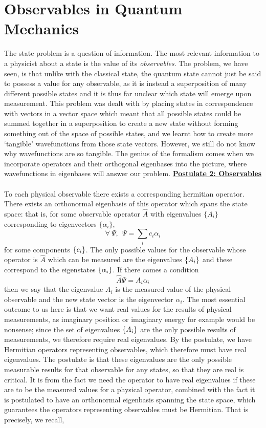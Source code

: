\section{Observables in Quantum Mechanics}
The state problem is a question of information. The most relevant information to a physicist about a state is the value of its \textit{observables}. The problem, we have seen, is that unlike with the classical state, the quantum state cannot just be said to possess a value for any observable, as it is instead a superposition of many different possible states and it is thus far unclear which state will emerge upon measurement. This problem was dealt with by placing states in correspondence with vectors in a vector space which meant that all possible states could be summed together in a superposition to create a new state without forming something out of the space of possible states, and we learnt how to create more `tangible' wavefunctions from those state vectors. However, we still do not know why wavefunctions are so tangible. The genius of the formalism comes when we incorporate operators and their orthogonal eigenbases into the picture, where wavefunctions in eigenbases will answer our problem.
\Answer
\underline{\textbf{Postulate 2: Observables}}\\\\
To each physical observable there exists a corresponding hermitian operator. There exists an orthonormal eigenbasis of this operator which spans the state space: that is, for some observable operator $\hat{A}$ with eigenvalues $\{A_{i}\}$ corresponding to eigenvectors $\{\alpha_{i}\}$,
$$
\forall\:\Psi, \:\: \Psi=\sum_{i}c_{i}\alpha_{i}
$$
for some components $\{c_{i}\}$. The only possible values for the observable whose operator is $\hat{A}$ which can be measured are the eigenvalues $\{A_{i}\}$ and these correspond to the eigenstates $\{\alpha_{i}\}$. If there comes a condition 
$$
\hat{A}\Psi=A_{i}\alpha_{i}
$$
then we say that the eigenvalue $A_{i}$ is the measured value of the physical observable and the new state vector is the eigenvector $\alpha_{i}$. 
\Answerend
The most essential outcome to us here is that we want real values for the results of physical measurements, as imaginary position or imaginary energy for example would be nonsense; since the set of eigenvalues $\{A_{i}\}$ are the only possible results of measurements, we therefore require real eigenvalues. By the postulate, we have Hermitian operators representing observables, which therefore must have real eigenvalues. The postulate is that these eigenvalues are the only possible measurable results for that observable for any states, so that they are real is critical. It is from the fact we need the operator to have real eigenvalues if these are to be the measured values for a physical operator, combined with the fact it is postulated to have an orthonormal eigenbasis spanning the state space, which guarantees the operators representing observables must be Hermitian. That is precisely, we recall,
